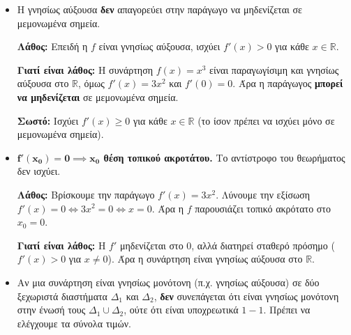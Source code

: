 \begin{itemize}[label=\textcolor{red!80!black}{\faExclamationTriangle},itemindent=7mm,leftmargin=0mm]
\item {}

Η γνησίως αύξουσα \textbf{δεν} απαγορεύει στην παράγωγο να μηδενίζεται σε μεμονωμένα σημεία.


\lysh
\textbf{Λάθος:} Επειδή η $f$ είναι γνησίως αύξουσα, ισχύει $f'(x) > 0$ για κάθε $x \in \mathbb{R}$.

\textbf{Γιατί είναι λάθος:} Η συνάρτηση $f(x) = x^3$ είναι παραγωγίσιμη και γνησίως αύξουσα στο $\mathbb{R}$, όμως $f'(x) = 3x^2$ και $f'(0) = 0$. Άρα η παράγωγος \textbf{μπορεί να μηδενίζεται} σε μεμονωμένα σημεία.

\textbf{Σωστό:} Ισχύει $f'(x) \ge 0$ για κάθε $x \in \mathbb{R}$ (το ίσον πρέπει να ισχύει μόνο σε μεμονωμένα σημεία).

\item \textbf{$\boldsymbol{f'(x_0) = 0 \implies x_0}$ θέση τοπικού ακροτάτου.}
Το αντίστροφο του θεωρήματος  δεν ισχύει.


\lysh
\textbf{Λάθος:} Βρίσκουμε την παράγωγο $f'(x) = 3x^2$. Λύνουμε την εξίσωση $f'(x) = 0 \iff 3x^2 = 0 \iff x = 0$. Άρα η $f$ παρουσιάζει τοπικό ακρότατο στο $x_0 = 0$.

\textbf{Γιατί είναι λάθος:} Η $f'$ μηδενίζεται στο $0$, αλλά διατηρεί σταθερό πρόσημο ($f'(x) > 0$ για $x \neq 0$). Άρα η συνάρτηση είναι γνησίως αύξουσα στο $\mathbb{R}$.

\item {}

Αν μια συνάρτηση είναι γνησίως μονότονη (π.χ. γνησίως αύξουσα) σε δύο ξεχωριστά διαστήματα $\Delta_1$ και $\Delta_2$, \textbf{δεν} συνεπάγεται ότι είναι γνησίως μονότονη στην ένωσή τους $\Delta_1 \cup \Delta_2$, ούτε ότι είναι υποχρεωτικά $1-1$. Πρέπει να ελέγχουμε τα σύνολα τιμών.



\end{itemize}
